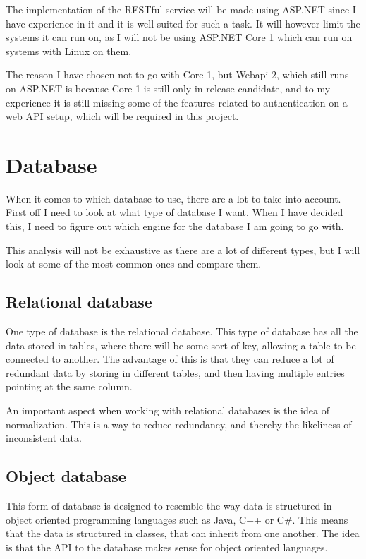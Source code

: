 The implementation of the RESTful service will be made using ASP.NET since I
have experience in it and it is well suited for such a task. It will however
limit the systems it can run on, as I will not be using ASP.NET Core 1 which can
run on systems with Linux on them\cite{asp5:intro}. 

The reason I have chosen not to go with Core 1, but Webapi 2, which still runs
on ASP.NET is because Core 1 is still only in release
candidate\cite{asp_core_1:roadmap}, and to my experience it is still missing
some of the features related to authentication on a web API setup, which will be
required in this project. 

\section{Database }
\label{sec:Database_engine}
When it comes to which database to use, there are a lot to take into account.
First off I need to look at what type of database I want. When I have decided
this, I need to figure out which engine for the database I am going to go with.

This analysis will not be exhaustive as there are a lot of different types, but
I will look at some of the most common ones and compare them. 

\subsection{Relational database}
\label{sub:Relational database}
One type of database is the relational database. This type of database has all
the data stored in tables, where there will be some sort of key, allowing a
table to be connected to another. The advantage of this is that they can reduce
a lot of redundant data by storing in different tables, and then having multiple
entries pointing at the same column\cite{ibm:choosing_dbms}. 

An important aspect when working with relational databases is the idea of
normalization. This is a way to reduce redundancy, and thereby the likeliness
of inconsistent data. 

\subsection{Object database}
\label{sub:Object database}
This form of database is designed to resemble the way data is structured in
object oriented programming languages such as Java, C++ or C\#. This means that
the data is structured in classes, that can inherit from one another. The idea
is that the API to the database makes sense for object oriented languages. 

